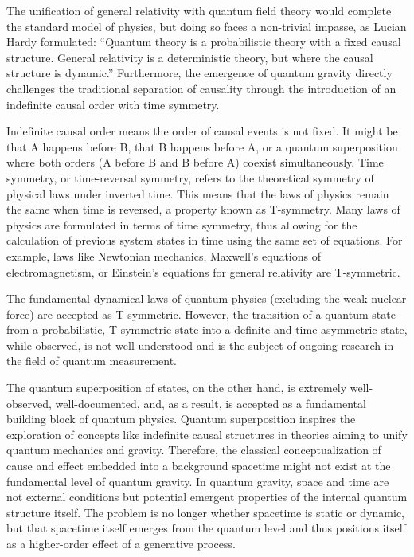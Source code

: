 The unification of general relativity with quantum field theory would complete the standard model of physics, but doing so faces a non-trivial impasse, as Lucian Hardy\cite{HardyDynamicCausalStructure} formulated: ``Quantum theory is a probabilistic theory with a fixed causal structure. General relativity is a deterministic theory, but where the causal structure is dynamic.'' Furthermore, the emergence of quantum gravity directly challenges the traditional separation of causality through the introduction of an indefinite causal order with time symmetry\cite{MriniHardyIndefinite}.

Indefinite causal order means the order of causal events is not fixed. It might be that A happens before B, that B happens before A, or a quantum superposition where both orders (A before B and B before A) coexist simultaneously. Time symmetry, or time-reversal symmetry, refers to the theoretical symmetry of physical laws under inverted time. This means that the laws of physics remain the same when time is reversed, a property known as T-symmetry. Many laws of physics are formulated in terms of time symmetry, thus allowing for the calculation of previous system states in time using the same set of equations. For example, laws like Newtonian mechanics, Maxwell's equations of electromagnetism, or Einstein's equations for general relativity are T-symmetric.

The fundamental dynamical laws of quantum physics (excluding the weak nuclear force) are accepted as T-symmetric. However, the transition of a quantum state from a probabilistic, T-symmetric state into a definite and time-asymmetric state, while observed, is not well understood and is the subject of ongoing research in the field of quantum measurement.

The quantum superposition of states, on the other hand, is extremely well-observed, well-documented, and, as a result, is accepted as a fundamental building block of quantum physics. Quantum superposition inspires the exploration of concepts like indefinite causal structures in theories aiming to unify quantum mechanics and gravity. Therefore, the classical conceptualization of cause and effect embedded into a background spacetime might not exist at the fundamental level of quantum gravity. In quantum gravity, space and time are not external conditions but potential emergent properties of the internal quantum structure itself. The problem is no longer whether spacetime is static or dynamic, but that spacetime itself emerges from the quantum level and thus positions itself as a higher-order effect of a generative process.

